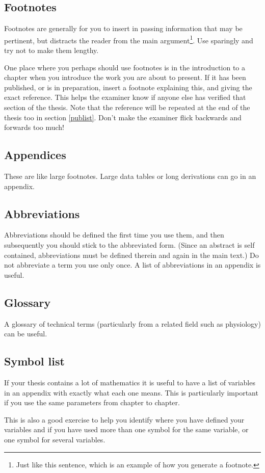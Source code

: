 \subsection{Footnotes}

Footnotes are generally for you to insert in passing information
that may be pertinent, but distracts the reader from the main 
argument\footnote{Just like this sentence, which is an example
of how you generate a footnote.}. Use sparingly and try not to 
make them lengthy.
\par
One place where you perhaps should use footnotes is in the introduction
to a chapter when you introduce the work you are about to present.
If it has been published, or is in preparation, insert a footnote
explaining this, and giving the exact reference. This helps the examiner
know if anyone else has verified that section of the thesis.  
Note that the reference will be repeated at the end of the thesis too
in section \ref{publist}. Don't make the examiner
flick backwards and forwards too much!


\subsection{Appendices}
These are like large footnotes. Large data tables or long derivations
can go in an appendix.

\subsection{Abbreviations}

Abbreviations should be defined the first time you use them, and then subsequently you should stick to the abbreviated form. (Since an abstract is self contained, abbreviations must be defined therein and again in the main text.)
Do not abbreviate a term you use only once. A list of abbreviations in an appendix is useful.

\subsection{Glossary}

A glossary of technical terms (particularly from a related field such as physiology) can be useful. 

\subsection{Symbol list}

If your thesis contains a lot of mathematics it is useful to have a list
of variables in an appendix with exactly what each one means. This is 
particularly important if you use the same parameters from chapter to chapter.

This is also a good exercise to help you identify where you have defined 
your variables and if you have used more than one symbol for the same variable, or one symbol for several variables.  